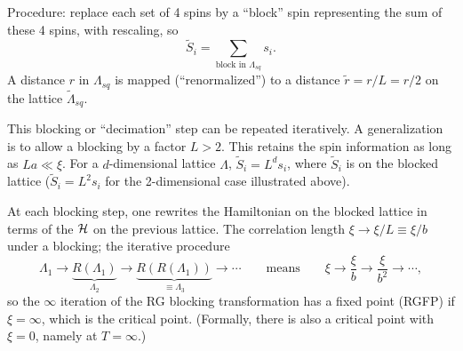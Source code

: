 \begin{diagram}
\end{diagram}

Procedure: replace each set of 4 spins by a ``block'' spin representing the sum of these 4 spins, with
rescaling, so
\begin{equation}
  \tilde S_i = \sum_{\text{block in }\Lambda_{sq}}s_i .
\end{equation}
A distance $r$ in $\Lambda_{sq}$ is mapped (``renormalized'') to a distance $\tilde r = r/L = r/2$
on the lattice $\tilde\Lambda_{sq}$.

This blocking or ``decimation'' step can be repeated iteratively. A generalization is to allow a
blocking by a factor $L>2$. This retains the spin information as long as $La\ll\xi$. For a
$d$-dimensional lattice $\Lambda$, $\tilde S_i = L^ds_i$, where $\tilde S_i$ is on the blocked lattice
($\tilde S_i = L^2s_i$ for the 2-dimensional case illustrated above).

At each blocking step, one rewrites the Hamiltonian on the blocked lattice in terms of the $\mathcal{H}$ on the
previous lattice. The correlation length $\xi\to\xi/L\equiv\xi/b$ under a blocking; the
iterative procedure
\begin{equation}
  \Lambda_1\to\underbrace{R(\Lambda_1)}_{\Lambda_2}\to\underbrace{R(R(\Lambda_1))}_{\equiv\Lambda_3}\to\cdots
  \qquad\text{means}\qquad \xi\to\frac{\xi}{b}\to\frac{\xi}{b^2}\to\cdots,
\end{equation}
so the $\infty$ iteration of the RG blocking transformation has a fixed point (RGFP) if $\xi = \infty$,
which is the critical point. (Formally, there is also a critical point with $\xi = 0$, namely at
$T = \infty$.)

